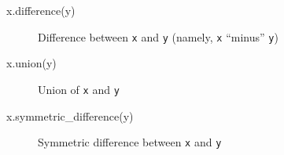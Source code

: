 \documentclass[
  letterpaper,
]{krantz}
\newenvironment{Shaded}{\begin{snugshade}}{\end{snugshade}}
\newcommand{\NormalTok}[1]{\textcolor[rgb]{0.00,0.23,0.31}{#1}}
\begin{document}
\begin{Shaded}
\begin{Highlighting}[]
\NormalTok{x.difference(y)}
\end{Highlighting}
\end{Shaded}

\begin{figure}[H]


\caption{\label{fig-difference}Difference between \texttt{x} and
\texttt{y} (namely, \texttt{x} ``minus'' \texttt{y})}

\end{figure}%

\begin{Shaded}
\begin{Highlighting}[]
\NormalTok{x.union(y)}
\end{Highlighting}
\end{Shaded}

\begin{figure}[H]


\caption{\label{fig-union}Union of \texttt{x} and \texttt{y}}

\end{figure}%

\begin{Shaded}
\begin{Highlighting}[]
\NormalTok{x.symmetric\_difference(y)}
\end{Highlighting}
\end{Shaded}

\begin{figure}[H]


\caption{\label{fig-symmetric-difference}Symmetric difference between
\texttt{x} and \texttt{y}}

\end{figure}%
\end{document}
